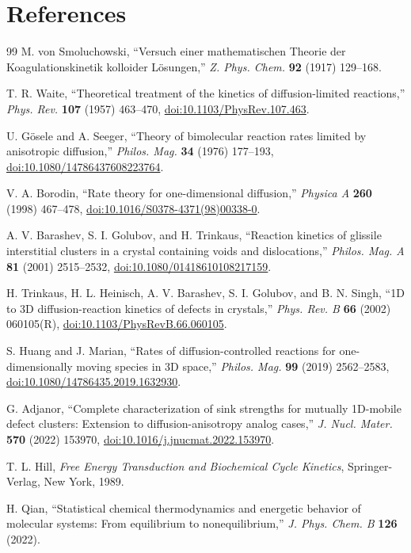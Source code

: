 \documentclass[11pt]{article}
\begin{document}
\section*{References}
\begin{thebibliography}{99}
M. von Smoluchowski, ``Versuch einer mathematischen Theorie der
Koagulationskinetik kolloider L{\"o}sungen,''
\emph{Z. Phys. Chem.} \textbf{92} (1917) 129--168.

T. R. Waite, ``Theoretical treatment of the kinetics of diffusion-limited
reactions,'' \emph{Phys. Rev.} \textbf{107} (1957) 463--470,
\href{https://doi.org/10.1103/PhysRev.107.463}{doi:10.1103/PhysRev.107.463}.

U. G{\"o}sele and A. Seeger, ``Theory of bimolecular reaction rates limited
by anisotropic diffusion,'' \emph{Philos. Mag.} \textbf{34} (1976) 177--193,
\href{https://doi.org/10.1080/14786437608223764}
{doi:10.1080/14786437608223764}.

V. A. Borodin, ``Rate theory for one-dimensional diffusion,''
\emph{Physica A} \textbf{260} (1998) 467--478,
\href{https://doi.org/10.1016/S0378-4371(98)00338-0}
{doi:10.1016/S0378-4371(98)00338-0}.

A. V. Barashev, S. I. Golubov, and H. Trinkaus, ``Reaction kinetics of
glissile interstitial clusters in a crystal containing voids and
dislocations,'' \emph{Philos. Mag. A} \textbf{81} (2001) 2515--2532,
\href{https://doi.org/10.1080/01418610108217159}
{doi:10.1080/01418610108217159}.

H. Trinkaus, H. L. Heinisch, A. V. Barashev, S. I. Golubov, and B. N. Singh,
``1D to 3D diffusion-reaction kinetics of defects in crystals,''
\emph{Phys. Rev. B} \textbf{66} (2002) 060105(R),
\href{https://doi.org/10.1103/PhysRevB.66.060105}
{doi:10.1103/PhysRevB.66.060105}.

S. Huang and J. Marian, ``Rates of diffusion-controlled reactions for
one-dimensionally moving species in 3D space,''
\emph{Philos. Mag.} \textbf{99} (2019) 2562--2583,
\href{https://doi.org/10.1080/14786435.2019.1632930}
{doi:10.1080/14786435.2019.1632930}.

G. Adjanor, ``Complete characterization of sink strengths for mutually
1D-mobile defect clusters: Extension to diffusion-anisotropy analog cases,''
\emph{J. Nucl. Mater.} \textbf{570} (2022) 153970,
\href{https://doi.org/10.1016/j.jnucmat.2022.153970}
{doi:10.1016/j.jnucmat.2022.153970}.

T. L. Hill, \emph{Free Energy Transduction and Biochemical Cycle Kinetics},
Springer-Verlag, New York, 1989.

H. Qian, ``Statistical chemical thermodynamics and energetic behavior of
molecular systems: From equilibrium to nonequilibrium,''
\emph{J. Phys. Chem. B} \textbf{126} (2022).
\end{thebibliography}
\end{document}
